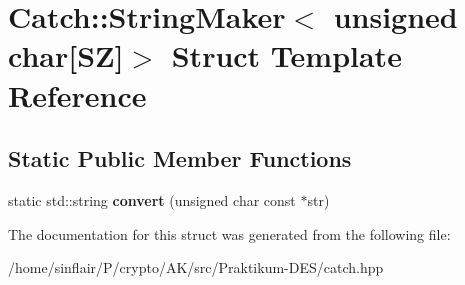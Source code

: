 \hypertarget{structCatch_1_1StringMaker_3_01unsigned_01char[SZ]_4}{}\section{Catch\+:\+:String\+Maker$<$ unsigned char\mbox{[}SZ\mbox{]}$>$ Struct Template Reference}
\label{structCatch_1_1StringMaker_3_01unsigned_01char[SZ]_4}
\subsection*{Static Public Member Functions}
\begin{DoxyCompactItemize}
\item 
\mbox{\label{structCatch_1_1StringMaker_3_01unsigned_01char[SZ]_4_a590d64c72b0cc75c113f1eea95d52b66}} 
static std\+::string {\bfseries convert} (unsigned char const $\ast$str)
\end{DoxyCompactItemize}


The documentation for this struct was generated from the following file\+:\begin{DoxyCompactItemize}
\item 
/home/sinflair/\+P/crypto/\+A\+K/src/\+Praktikum-\/\+D\+E\+S/catch.\+hpp\end{DoxyCompactItemize}
